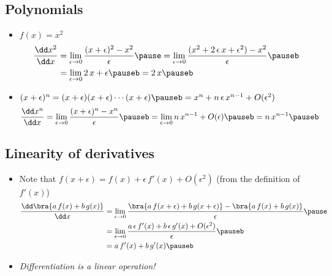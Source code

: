 \begin{slide}
\section{Polynomials}

\begin{PauseHighLight}
  \begin{itemize}
  \item $f(x)=x^2$
    \begin{align*}
      \frac{\dd x^2}{\dd x} &= \lim_{\epsilon\rightarrow 0}
      \frac{(x+\epsilon)^2 - x^2}{\epsilon}\pause
      =  \lim_{\epsilon\rightarrow 0}
      \frac{(x^2 + 2\,\epsilon\,x + \epsilon^2) -
                              x^2}{\epsilon}\pauseb
                              \\
      &= \lim_{\epsilon\rightarrow 0} 2\,x + \epsilon\pauseb = 2\,x\pauseb
    \end{align*}
  \item $(x+\epsilon)^n =
    (x+\epsilon)(x+\epsilon)\cdots(x+\epsilon)\pauseb = x^n +
    n\,\epsilon\,x^{n-1} + O(\epsilon^2)$\pauseb
     \begin{align*}
      \frac{\dd x^n}{\dd x} &= \lim_{\epsilon\rightarrow 0}
      \frac{(x+\epsilon)^n - x^n}{\epsilon}\pauseb
      =   \lim_{\epsilon\rightarrow 0} n\,x^{n-1} + O(\epsilon)\pauseb = n\,x^{n-1}\pauseb
    \end{align*}
  \end{itemize}
\end{PauseHighLight}

\end{slide}


\begin{slide}
\section{Linearity of derivatives}
  
\begin{PauseHighLight}
  \begin{itemize}
  \item Note that $f(x+\epsilon) = f(x) + \epsilon\, f'(x) +
    O(\epsilon^2)$ (from the definition of $f'(x)$)\pause
    \begin{align*}
      \frac{\dd \bra{a\,f(x)+b\,g(x)}}{\dd x}
      &=
      \lim_{\epsilon\rightarrow 0}
      \frac{\bra{a\,f(x+\epsilon)+b\,g(x+\epsilon)}-\bra{a\,f(x)+b\,g(x)}}{\epsilon}
      \pause \\
      &=  \lim_{\epsilon\rightarrow 0}
        \frac{a\,\epsilon\, f'(x) +b\,\epsilon\,g'(x) +
        O(\epsilon^2)}{\epsilon}\pauseb \\
      &= a\,f'(x) + b\,g'(x) \pauseb
    \end{align*}
  \item \emph{Differentiation is a linear operation!}\pauseb
  \end{itemize}
\end{PauseHighLight}

\end{slide}

